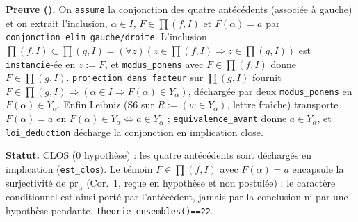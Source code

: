 \textbf{Preuve (\Nstar).} On \texttt{assume} la conjonction des quatre antécédents (associée à gauche) et on extrait l'inclusion, $\alpha\in I$, $F\in\prod(f,I)$ et $F(\alpha)=a$ par \texttt{conjonction\_elim\_gauche/droite}. L'inclusion $\prod(f,I)\subset\prod(g,I)=(\forall z)(z\in\prod(f,I)\Rightarrow z\in\prod(g,I))$ est \texttt{instancie}-ée en $z:=F$, et \texttt{modus\_ponens} avec $F\in\prod(f,I)$ donne $F\in\prod(g,I)$. \texttt{projection\_dans\_facteur} sur $\prod(g,I)$ fournit $F\in\prod(g,I)\Rightarrow(\alpha\in I\Rightarrow F(\alpha)\in Y_\alpha)$, déchargée par deux \texttt{modus\_ponens} en $F(\alpha)\in Y_\alpha$. Enfin Leibniz (S6 sur $R:=(w\in Y_\alpha)$, lettre fraîche) transporte $F(\alpha)=a$ en $F(\alpha)\in Y_\alpha\Leftrightarrow a\in Y_\alpha$ ; \texttt{equivalence\_avant} donne $a\in Y_\alpha$, et \texttt{loi\_deduction} décharge la conjonction en implication close.

\textbf{Statut.} CLOS (0 hypothèse) : les quatre antécédents sont déchargés en implication (\texttt{est\_clos}). Le témoin $F\in\prod(f,I)$ avec $F(\alpha)=a$ encapsule la surjectivité de $\mathrm{pr}_\alpha$ (Cor.~1, reçue en hypothèse et non postulée) ; le caractère conditionnel est ainsi porté par l'antécédent, jamais par la conclusion ni par une hypothèse pendante. \texttt{theorie\_ensembles()==22}.
